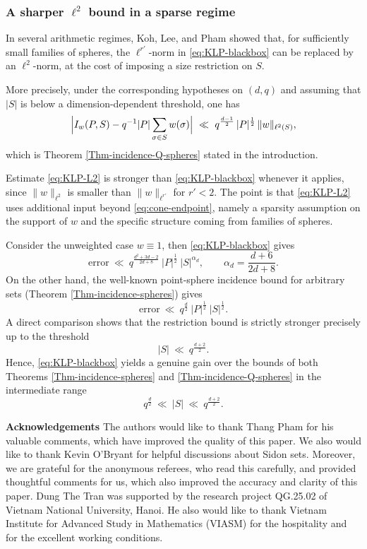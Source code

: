 \documentclass{article}
\begin{document}
\subsubsection*{A sharper $\ell^2$ bound in a sparse regime}
In several arithmetic regimes, Koh, Lee, and Pham showed that, for sufficiently small families of spheres,
the $\ell^{r'}$-norm in \eqref{eq:KLP-blackbox} can be replaced by an $\ell^2$-norm, at the cost of imposing a size restriction on $S$.

More precisely, under the corresponding hypotheses on $(d,q)$ and assuming that $|S|$ is below a dimension-dependent threshold, one has
\begin{equation}\label{eq:KLP-L2}
\Bigl|I_w(P,S)-q^{-1}|P|\sum_{\sigma\in S} w(\sigma)\Bigr|
\ \ll \
q^{\frac{d-1}{2}}\,
|P|^{\frac{1}{2}}\,
\|w\|_{\ell^2(S)},
\end{equation}
which is Theorem \ref{Thm-incidence-Q-spheres} stated in the introduction. 

Estimate \eqref{eq:KLP-L2} is stronger than \eqref{eq:KLP-blackbox} whenever it applies, since $\|w\|_{\ell^2}$
is smaller than $\|w\|_{\ell^{r'}}$ for $r'<2$.
The point is that \eqref{eq:KLP-L2} uses additional input beyond \eqref{eq:cone-endpoint}, namely a sparsity
assumption on the support of $w$ and the specific structure coming from families of spheres.

Consider the unweighted case $w\equiv 1$, then \eqref{eq:KLP-blackbox} gives
\[
\text{error}\ \ll\ q^{\frac{d^2+3d-2}{2d+8}}\ |P|^{\frac{1}{2}}\ |S|^{\alpha_d},
\qquad
\alpha_d=\frac{d+6}{2d+8}.
\]
On the other hand, the well-known point-sphere incidence bound for arbitrary sets (Theorem \ref{Thm-incidence-spheres}) gives
\[
\text{error}\ \ll\ q^{\frac{d}{2}}\ |P|^{\frac{1}{2}}\ |S|^{\frac{1}{2}}.
\]
A direct comparison shows that the restriction bound is strictly stronger precisely up to the threshold
\begin{equation*}\label{eq:KLP-threshold}
|S|\ \ll\ q^{\frac{d+2}{2}}.
\end{equation*}
Hence, \eqref{eq:KLP-blackbox} yields a genuine gain over the bounds of both Theorems \ref{Thm-incidence-spheres} and \ref{Thm-incidence-Q-spheres} in the intermediate range
\[
q^{\frac{d}{2}}\ \ll\ |S|\ \ll\ q^{\frac{d+2}{2}}.
\]



{\bf Acknowledgements} 
The authors would like to thank Thang Pham for his valuable comments, which have improved the quality of this paper. We also would like to thank Kevin O'Bryant for helpful discussions about Sidon sets. Moreover, we are grateful for the anonymous referees, who read this carefully, and provided thoughtful comments for us, which also improved the accuracy and clarity of this paper. Dung The Tran was supported by the research project QG.25.02 of Vietnam National University, Hanoi. He also would like to thank Vietnam Institute for Advanced Study in Mathematics (VIASM) for the hospitality and for the excellent working conditions. 
 
\end{document}
